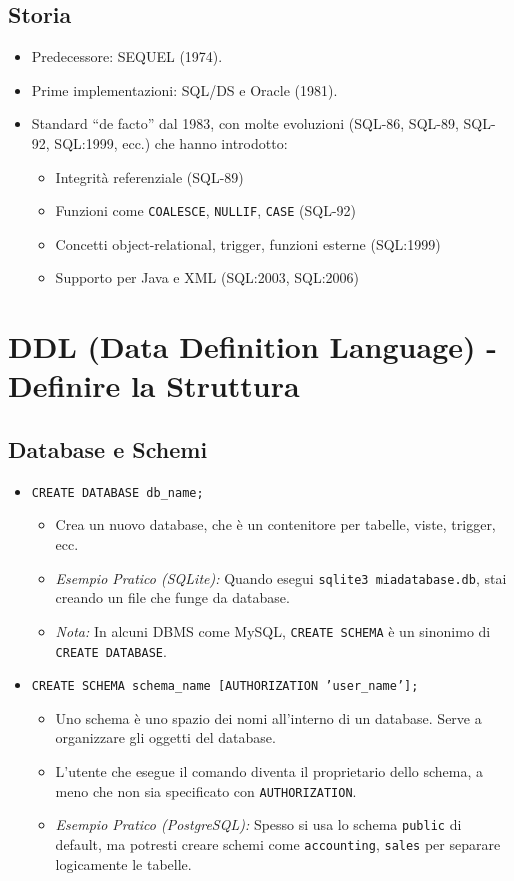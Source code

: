 \documentclass{article}
\begin{document}
	\subsection{Storia}
	\begin{itemize}
		\item Predecessore: SEQUEL (1974).
		\item Prime implementazioni: SQL/DS e Oracle (1981).
		\item Standard ``de facto'' dal 1983, con molte evoluzioni (SQL-86, SQL-89, SQL-92, SQL:1999, ecc.) che hanno introdotto:
		\begin{itemize}
			\item Integrità referenziale (SQL-89)
			\item Funzioni come \texttt{COALESCE}, \texttt{NULLIF}, \texttt{CASE} (SQL-92)
			\item Concetti object-relational, trigger, funzioni esterne (SQL:1999)
			\item Supporto per Java e XML (SQL:2003, SQL:2006)
		\end{itemize}
	\end{itemize}
	
	\section{DDL (Data Definition Language) - Definire la Struttura}
	
	\subsection{Database e Schemi}
	\begin{itemize}
		\item \texttt{CREATE DATABASE db\_name;}
		\begin{itemize}
			\item Crea un nuovo database, che è un contenitore per tabelle, viste, trigger, ecc.
			\item \textit{Esempio Pratico (SQLite):} Quando esegui \texttt{sqlite3 miadatabase.db}, stai creando un file che funge da database.
			\item \textit{Nota:} In alcuni DBMS come MySQL, \texttt{CREATE SCHEMA} è un sinonimo di \texttt{CREATE DATABASE}.
		\end{itemize}
		\item \texttt{CREATE SCHEMA schema\_name [AUTHORIZATION 'user\_name'];}
		\begin{itemize}
			\item Uno schema è uno spazio dei nomi all'interno di un database. Serve a organizzare gli oggetti del database.
			\item L'utente che esegue il comando diventa il proprietario dello schema, a meno che non sia specificato con \texttt{AUTHORIZATION}.
			\item \textit{Esempio Pratico (PostgreSQL):} Spesso si usa lo schema \texttt{public} di default, ma potresti creare schemi come \texttt{accounting}, \texttt{sales} per separare logicamente le tabelle.
		\end{itemize}
	\end{itemize}
	
\end{document}
